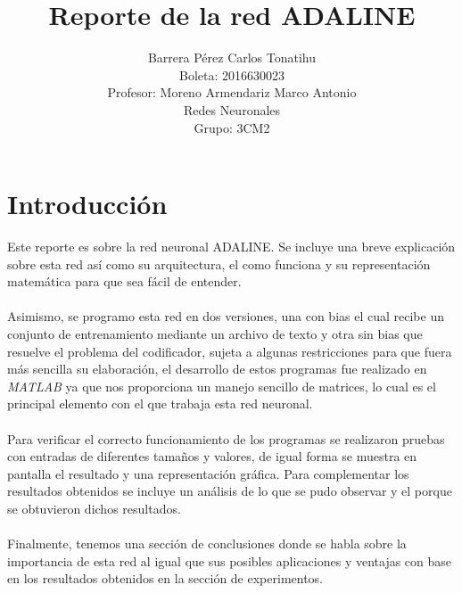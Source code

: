 \documentclass[12pt, titlepage]{article}
\title{Reporte de la red ADALINE}
\author{Barrera Pérez Carlos Tonatihu \\Boleta: 2016630023\\ Profesor: Moreno Armendariz Marco Antonio \\ Redes Neuronales \\ Grupo: 3CM2 }
\begin{document}
    \maketitle
    \tableofcontents
    \newpage
    \section{Introducción}
    Este reporte es sobre la red neuronal ADALINE. Se incluye una breve explicación sobre esta red así como su arquitectura, el como funciona y su representación matemática para que sea fácil de entender.
    \\\\
    Asimismo, se programo esta red en dos versiones, una con bias el cual recibe un conjunto de entrenamiento mediante un archivo de texto y otra sin bias que resuelve el problema del codificador, sujeta a algunas restricciones para que fuera más sencilla su elaboración, el desarrollo de estos programas fue realizado en \emph{MATLAB} ya que nos proporciona un manejo sencillo de matrices, lo cual es el principal elemento con el que trabaja esta red neuronal. 
    \\\\
    Para verificar el correcto funcionamiento de los programas se realizaron pruebas con entradas de diferentes tamaños y valores, de igual forma se muestra en pantalla el resultado y una representación gráfica. Para complementar los resultados obtenidos se incluye un análisis de lo que se pudo observar y el porque se obtuvieron dichos resultados.
    \\\\
    Finalmente, tenemos una sección de conclusiones donde se habla sobre la importancia de esta red al igual que sus posibles aplicaciones y ventajas con base en los resultados obtenidos en la sección de experimentos.
    \newpage
\end{document}
